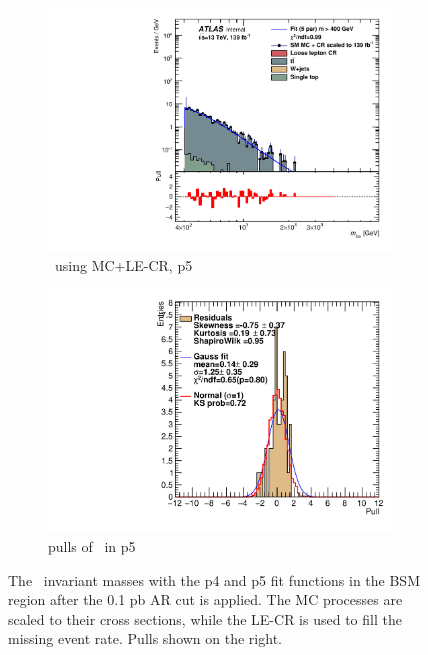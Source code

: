 \begin{figure}[ht]
\begin{subfigure}[h]{0.38\linewidth}
    \includegraphics[scale=0.3]{figs/ch6/fit/variable_nosmooth/p5/01PB/output_SMMCplusCR_Mbm_p5.pdf}%
     \caption{\mbmu \ using MC+LE-CR, p5}
     \end{subfigure}
     \hfill
    \begin{subfigure}[h]{0.4\linewidth}
    \includegraphics[scale=0.32]{figs/ch6/fit/variable_nosmooth/p5/01PB/pull_SMMCplusCR_Mbm_p5.pdf}%
    \caption{pulls of \mbmu \ in p5}
    \end{subfigure}
    \caption{The \mbmu \ invariant masses with the p4 and p5 fit functions in the BSM region after the 0.1 pb AR cut is applied. The MC processes are scaled to their cross sections, while the LE-CR is used to fill the missing event rate. Pulls shown on the right.}
\label{fig:mbm-fit-pulls-01pb}
\end{figure}

